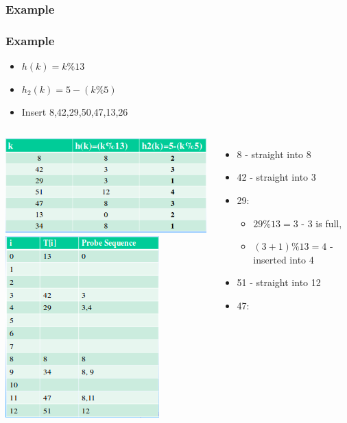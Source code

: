 \documentclass{beamer}
\begin{document}
\subsubsection{Example}
\begin{frame}
\frametitle{Example}
\begin{itemize}
\item $h(k) = k\%13$
\item $h_2(k) = 5-(k\%5)$
\item Insert 8,42,29,50,47,13,26
\end{itemize}
\begin{columns}[c]
\includegraphics[scale=0.3]{hs.png}\\
\includegraphics[scale=0.4]{finaldh.png}
\begin{itemize}
\tiny
\item 8 - straight into 8
\item 42 - straight into 3
\item 29:
\begin{itemize}
\tiny
\item $29\%13 = 3$ - 3 is full,
\item $(3+1)\%13 = 4$ - inserted into 4
\end{itemize}
\item 51 - straight into 12
\item 47:

\end{itemize}
\end{columns}
\end{frame}
\end{document}
